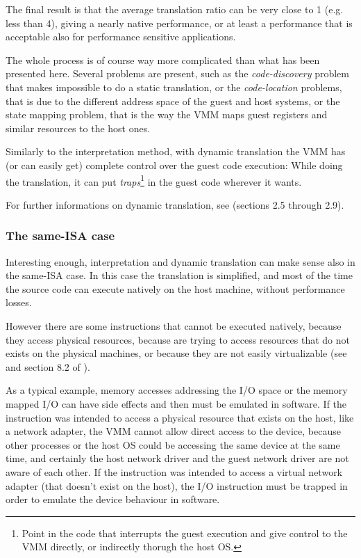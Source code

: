 The final result is that the average translation ratio can be very close to 1 (e.g. less than 4), giving a nearly native performance,
or at least a performance that is acceptable also for performance sensitive applications.

\vspace{0.5cm}

The whole process is of course way more complicated than what has been presented here. Several problems are present, such as the 
\emph{code-discovery} problem that makes impossible to do a static translation, or the \emph{code-location} problems, that is due
to the different address space of the guest and host systems, or the state mapping problem, that is the way the VMM maps guest registers
and similar resources to the host ones.

Similarly to the interpretation method, with dynamic translation the VMM has (or can easily get) complete control over the guest code
execution: While doing the translation, it can put \emph{traps}\footnote{Point in the code that interrupts the guest
execution and give control to the VMM directly, or indirectly thorugh the host OS.} in the guest code wherever it wants.

For further informations on dynamic translation, see \cite{ref:vmbook} (sections 2.5 through 2.9).


\subsubsection{The same-ISA case}
\label{sec:sidt}
Interesting enough, interpretation and dynamic translation can make sense also in the same-ISA case. In this case the translation is
simplified, and most of the time the source code can execute natively on the host machine, without performance losses.

However there are some instructions that cannot be executed natively, because they access physical resources, because
are trying to access resources that do not exists on the physical machines, or because they are not easily virtualizable (see
\cite{ref:x86-virt} and section 8.2 of \cite{ref:vmbook}).

\vspace{0.5cm}

As a typical example, memory accesses addressing the I/O space or the memory mapped I/O can have side effects and then must be emulated 
in software. If the instruction was intended to access a physical resource that exists on the host, like a network adapter, the VMM 
cannot allow direct access to the device, because other processes or the host OS could be accessing the same device at the same time,
and certainly the host network driver and the guest network driver are not aware of each other.
If the instruction was intended to access a virtual network adapter (that doesn't exist on the host), the I/O instruction must be trapped
in order to emulate the device behaviour in software.


